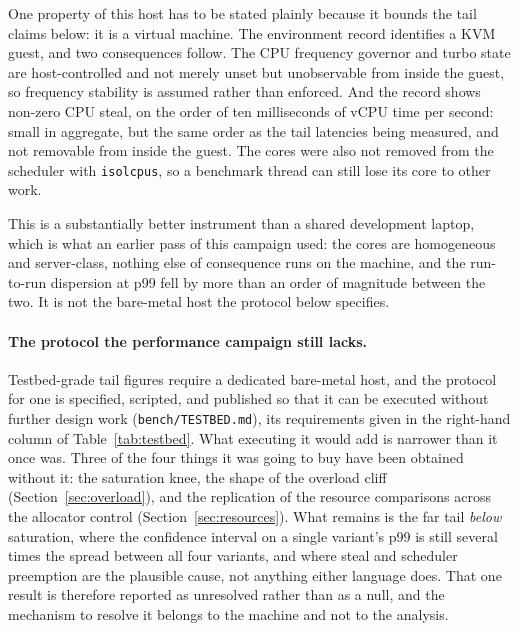 \documentclass[english,twoside,openright,a4paper,censored,csm,software-track-2020]{HYthesisML}
\begin{document}
One property of this host has to be stated plainly because it bounds the tail claims below: it is
a virtual machine. The environment record identifies a KVM guest, and two consequences follow.
The CPU frequency governor and turbo state are host-controlled and not merely unset but
unobservable from inside the guest, so frequency stability is assumed rather than enforced. And
the record shows non-zero CPU steal, on the order of ten milliseconds of vCPU time per second:
small in aggregate, but the same order as the tail latencies being measured, and not removable
from inside the guest. The cores were also not removed from the scheduler with
\texttt{isolcpus}, so a benchmark thread can still lose its core to other work.

This is a substantially better instrument than a shared development laptop, which is what an
earlier pass of this campaign used: the cores are homogeneous and server-class, nothing else of
consequence runs on the machine, and the run-to-run dispersion at p99 fell by more than an order
of magnitude between the two. It is not the bare-metal host the protocol below specifies.

\paragraph{The protocol the performance campaign still lacks.}
Testbed-grade tail figures require a dedicated bare-metal host, and the protocol for one is
specified, scripted, and published so that it can be executed without further design work
(\texttt{bench/TESTBED.md}), its requirements given in the right-hand column of
Table~\ref{tab:testbed}. What executing it would add is narrower than it once was. Three of the
four things it was going to buy have been obtained without it: the saturation knee, the shape of
the overload cliff
(Section~\ref{sec:overload}), and the replication of the resource comparisons across the allocator
control (Section~\ref{sec:resources}). What remains is the far tail \emph{below} saturation,
where the confidence interval on a single variant's p99 is still several times the spread between
all four variants, and where steal and scheduler preemption are the plausible cause, not
anything either language does. That one result is therefore reported as unresolved rather than as
a null, and the mechanism to resolve it belongs to the machine and not to the analysis.
\end{document}
